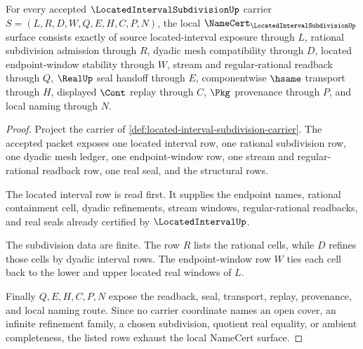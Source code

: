 \begin{theorem}
\label{thm:located-interval-subdivision-namecert-obligations}
For every accepted $\LocatedIntervalSubdivisionUp$ carrier $S=(L,R,D,W,Q,E,H,C,P,N)$, the local $\NameCert_{\LocatedIntervalSubdivisionUp}$ surface consists exactly of source located-interval exposure through $L$, rational subdivision admission through $R$, dyadic mesh compatibility through $D$, located endpoint-window stability through $W$, stream and regular-rational readback through $Q$, $\RealUp$ seal handoff through $E$, componentwise $\hsame$ transport through $H$, displayed $\Cont$ replay through $C$, $\Pkg$ provenance through $P$, and local naming through $N$.
\end{theorem}
\begin{proof}
Project the carrier of \autoref{def:located-interval-subdivision-carrier}. The accepted packet exposes one located interval row, one rational subdivision row, one dyadic mesh ledger, one endpoint-window row, one stream and regular-rational readback row, one real seal, and the structural rows.

The located interval row is read first. It supplies the endpoint names, rational containment cell, dyadic refinements, stream windows, regular-rational readbacks, and real seals already certified by $\LocatedIntervalUp$.

The subdivision data are finite. The row $R$ lists the rational cells, while $D$ refines those cells by dyadic interval rows. The endpoint-window row $W$ ties each cell back to the lower and upper located real windows of $L$.

Finally $Q,E,H,C,P,N$ expose the readback, seal, transport, replay, provenance, and local naming route. Since no carrier coordinate names an open cover, an infinite refinement family, a chosen subdivision, quotient real equality, or ambient completeness, the listed rows exhaust the local NameCert surface.
\end{proof}

